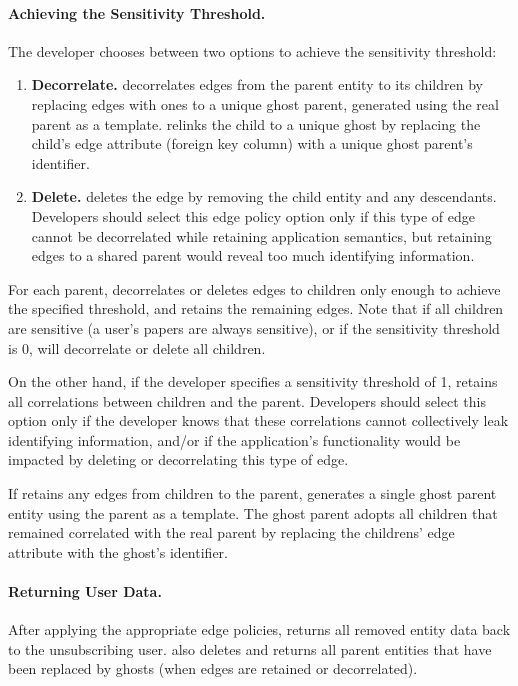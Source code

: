 \paragraph{Achieving the Sensitivity Threshold.}
The developer chooses between two options to achieve the sensitivity threshold: 
\begin{enumerate}
    \item \textbf{Decorrelate.}
    \sys decorrelates edges from the parent entity to its children by 
    replacing edges with ones to a unique ghost parent, generated using the
    real parent as a template. \sys relinks the child to a unique ghost by replacing the child's edge
    attribute (foreign key column) with a unique ghost parent's identifier. 

\item \textbf{Delete.}
    \sys deletes the edge by removing the child entity and any descendants. Developers should select
    this edge policy option only if this type of edge cannot be decorrelated while retaining application
    semantics, but retaining edges to a shared parent would reveal too much identifying information.
\end{enumerate}

For each parent, \sys decorrelates or deletes edges to children only enough to achieve the specified
threshold, and retains the remaining edges. Note that if all children are sensitive (a user's papers
are always sensitive), or if the sensitivity threshold is 0, \sys will decorrelate or delete all
children. 

On the other hand, if the developer specifies a sensitivity threshold of 1, \sys retains all
correlations between children and the parent. Developers should select this option only if the
developer knows that these correlations cannot collectively leak identifying information, and/or if
the application's functionality would be impacted by deleting or decorrelating this type of edge.

If \sys retains any edges from children to the parent, \sys generates a single ghost parent entity using the
parent as a template. The ghost parent adopts all children that remained correlated with the real
parent by replacing the childrens' edge attribute with the ghost's identifier.

\paragraph{Returning User Data.}
After applying the appropriate edge policies, \sys returns all 
removed entity data back to the unsubscribing user. \sys also deletes and returns all parent entities that
have been replaced by ghosts (when edges are retained or decorrelated).


